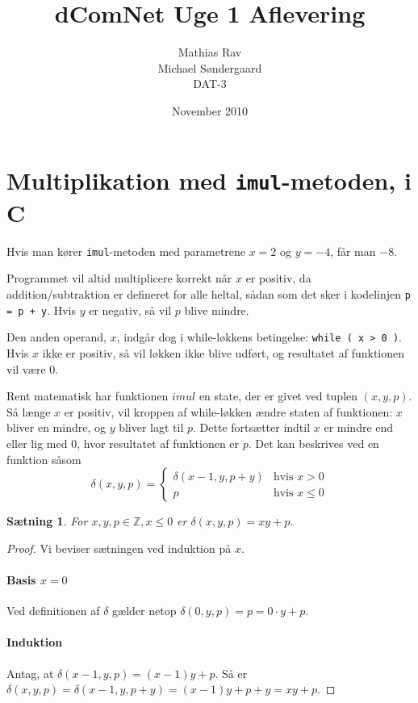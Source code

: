 \documentclass[12pt,a4paper]{article}
\newcommand{\imul}{\texttt{imul}}
\newtheorem{theorem}{Sætning}
\begin{document}
\title{dComNet Uge 1 Aflevering}
\author{Mathias Rav \\
		Michael Søndergaard \\
		DAT-3}
\date{November 2010}
\maketitle

\section{Multiplikation med \imul{}-metoden, i C}
Hvis man kører \imul{}-metoden med parametrene $x=2$ og $y=-4$, får man $-8$.

Programmet vil altid multiplicere korrekt når $x$ er positiv, da
addition/subtraktion er defineret for alle heltal, sådan som det sker i
kodelinjen \texttt{p = p + y}. Hvis $y$ er negativ, så vil $p$ blive mindre.

Den anden operand, $x$, indgår dog i while-løkkens betingelse: \texttt{while (
x > 0 )}. Hvis $x$ ikke er positiv, så vil løkken ikke blive udført, og
resultatet af funktionen vil være $0$.

Rent matematisk har funktionen $imul$ en state, der er givet ved tuplen
$(x,y,p)$. Så længe $x$ er positiv, vil kroppen af while-løkken ændre staten af
funktionen: $x$ bliver en mindre, og $y$ bliver lagt til $p$. Dette fortsætter
indtil $x$ er mindre end eller lig med $0$, hvor resultatet af funktionen er
$p$. Det kan beskrives ved en funktion såsom
\[\delta(x,y,p)=\left\{\begin{array}{cc}
	\delta(x-1,y,p+y) & \text{hvis }x>0 \\
	p & \text{hvis }x\leq 0
\end{array}\right.\]

\begin{theorem}
	For $x,y,p\in\mathbb{Z},x\leq0$ er $\delta(x,y,p)=xy+p$.
\end{theorem}

\begin{proof}
	Vi beviser sætningen ved induktion på $x$.
	\paragraph{Basis $x=0$} Ved definitionen af $\delta$ gælder netop $\delta(0,y,p)=p=0\cdot y+p$.
	\paragraph{Induktion} Antag, at $\delta(x-1,y,p)=(x-1)y+p$. Så er $\delta(x,y,p)=\delta(x-1,y,p+y)=(x-1)y+p+y=xy+p$. \qedhere
\end{proof}
\end{document}
